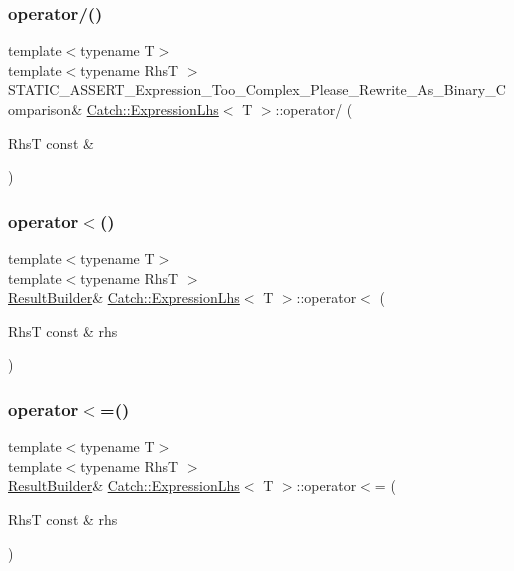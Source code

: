 \subsubsection{\texorpdfstring{operator/()}{operator/()}}
{\footnotesize\ttfamily template$<$typename T$>$ \\
template$<$typename RhsT $>$ \\
S\+T\+A\+T\+I\+C\+\_\+\+A\+S\+S\+E\+R\+T\+\_\+\+Expression\+\_\+\+Too\+\_\+\+Complex\+\_\+\+Please\+\_\+\+Rewrite\+\_\+\+As\+\_\+\+Binary\+\_\+\+Comparison\& \hyperlink{class_catch_1_1_expression_lhs}{Catch\+::\+Expression\+Lhs}$<$ T $>$\+::operator/ (\begin{DoxyParamCaption}\item[{RhsT const \&}]{ }\end{DoxyParamCaption})}

\hypertarget{class_catch_1_1_expression_lhs_a48428d358ddc89729e2e3407f4024dac}{}\label{class_catch_1_1_expression_lhs_a48428d358ddc89729e2e3407f4024dac} 
\subsubsection{\texorpdfstring{operator$<$()}{operator<()}}
{\footnotesize\ttfamily template$<$typename T$>$ \\
template$<$typename RhsT $>$ \\
\hyperlink{class_catch_1_1_result_builder}{Result\+Builder}\& \hyperlink{class_catch_1_1_expression_lhs}{Catch\+::\+Expression\+Lhs}$<$ T $>$\+::operator$<$ (\begin{DoxyParamCaption}\item[{RhsT const \&}]{rhs }\end{DoxyParamCaption})\hspace{0.3cm}{\ttfamily [inline]}}

\hypertarget{class_catch_1_1_expression_lhs_afd188990e8a14b49c308ce7a79056846}{}\label{class_catch_1_1_expression_lhs_afd188990e8a14b49c308ce7a79056846} 
\subsubsection{\texorpdfstring{operator$<$=()}{operator<=()}}
{\footnotesize\ttfamily template$<$typename T$>$ \\
template$<$typename RhsT $>$ \\
\hyperlink{class_catch_1_1_result_builder}{Result\+Builder}\& \hyperlink{class_catch_1_1_expression_lhs}{Catch\+::\+Expression\+Lhs}$<$ T $>$\+::operator$<$= (\begin{DoxyParamCaption}\item[{RhsT const \&}]{rhs }\end{DoxyParamCaption})\hspace{0.3cm}{\ttfamily [inline]}}

